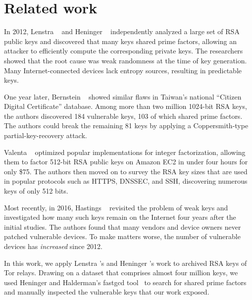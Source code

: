 \section{Related work}
In 2012, Lenstra \ea~\cite{Lenstra2012a} and Heninger \ea~\cite{Heninger2012a}
independently analyzed a large set of RSA public keys and discovered that many
keys shared prime factors, allowing an attacker to efficiently compute the
corresponding private keys.  The researchers showed that the root cause was weak
randomness at the time of key generation.  Many Internet-connected devices lack
entropy sources, resulting in predictable keys.

One year later, Bernstein \ea~\cite{Bernstein2013a} showed similar flaws in
Taiwan's national ``Citizen Digital Certificate'' database.  Among more than two
million 1024-bit RSA keys, the authors discovered 184 vulnerable keys, 103 of
which shared prime factors.  The authors could break the remaining 81 keys by
applying a Coppersmith-type partial-key-recovery attack.

Valenta \ea~\cite{Valenta2016a} optimized popular implementations for integer
factorization, allowing them to factor 512-bit RSA public keys on Amazon EC2 in
under four hours for only \$75.  The authors then moved on to survey the RSA key
sizes that are used in popular protocols such as HTTPS, DNSSEC, and SSH,
discovering numerous keys of only 512 bits.

Most recently, in 2016, Hastings \ea~\cite{Hastings2016a} revisited the problem
of weak keys and investigated how many such keys remain on the Internet four
years after the initial studies.  The authors found that many vendors and device
owners never patched vulnerable devices.  To make matters worse, the number of
vulnerable devices has \emph{increased} since 2012.

In this work, we apply Lenstra \ea's and Heninger \ea's work to archived RSA
keys of Tor relays.  Drawing on a dataset that comprises almost four million
keys, we used Heninger and Halderman's fastgcd tool~\cite{fastgcd} to
search for shared prime factors and manually inspected the vulnerable keys that
our work exposed.
